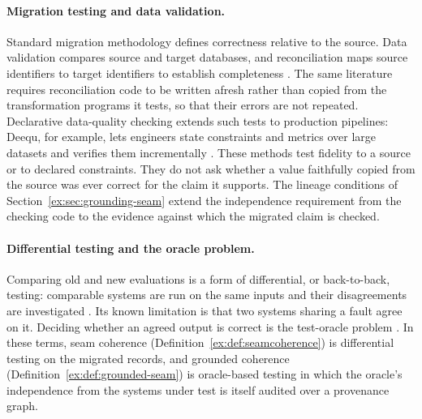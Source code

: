 \documentclass[twocolumn,envcountsect,envcountsame,natbib]{svjour3}
\begin{document}
\paragraph{Migration testing and data validation.} Standard migration methodology defines correctness relative to the source. Data validation compares source and target databases, and reconciliation maps source identifiers to target identifiers to establish completeness \citep{matthesschulzhaller2011}. The same literature requires reconciliation code to be written afresh rather than copied from the transformation programs it tests, so that their errors are not repeated. Declarative data-quality checking extends such tests to production pipelines: Deequ, for example, lets engineers state constraints and metrics over large datasets and verifies them incrementally \citep{schelter2018}. These methods test fidelity to a source or to declared constraints. They do not ask whether a value faithfully copied from the source was ever correct for the claim it supports. The lineage conditions of Section~\ref{ex:sec:grounding-seam} extend the independence requirement from the checking code to the evidence against which the migrated claim is checked.

\paragraph{Differential testing and the oracle problem.} Comparing old and new evaluations is a form of differential, or back-to-back, testing: comparable systems are run on the same inputs and their disagreements are investigated \citep{mckeeman1998}. Its known limitation is that two systems sharing a fault agree on it. Deciding whether an agreed output is correct is the test-oracle problem \citep{barr2015}. In these terms, seam coherence (Definition~\ref{ex:def:seamcoherence}) is differential testing on the migrated records, and grounded coherence (Definition~\ref{ex:def:grounded-seam}) is oracle-based testing in which the oracle's independence from the systems under test is itself audited over a provenance graph.
\end{document}

